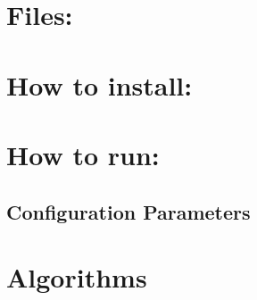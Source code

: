 \documentclass[float=false, crop=false]{standalone}
\begin{document}
\section{Files:}

\section{How to install:}

\section{How to run:}

\subsection{Configuration Parameters}

\section{Algorithms}
\end{document}
